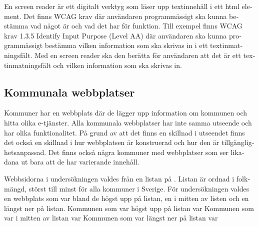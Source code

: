\documentclass[11p]{article}
\begin{document}
\begin{otherlanguage}{swedish}
    En screen reader är ett digitalt verktyg som läser upp textinnehåll i ett html element.
    Det finns WCAG krav där användaren programmässigt ska kunna bestämma vad något är och vad det har för funktion.
    Till exempel finns WCAG krav 1.3.5 Identify Input Purpose (Level AA) där användaren ska kunna programmässigt bestämma vilken information som ska skrivas in i ett textinmatningsfält.
    Med en screen reader ska den berätta för användaren att det är ett textinmatningsfält och vilken information som ska skrivas in.

    \subsection{Kommunala webbplatser} %
    Kommuner har en webbplats där de lägger upp information om kommunen och hitta olika e-tjänster.
    Alla kommunala webbplatser har inte samma utseende och har olika funktionalitet.
    På grund av att det finns en skillnad i utseendet finns det också en skillnad i hur webbplatsen är konstruerad och hur den är tillgänglighetsanpassad.
    Det finns också några kommuner med webbplatser som ser likadana ut bara att de har varierande innehåll.
    
    Webbsidorna i undersökningen valdes från en listan på \textcite{SverigesKommuner}.
    Listan är ordnad i folkmängd, störst till minst för alla kommuner i Sverige.
    För undersökningen valdes en webbplats som var bland de högst upp på listan, en i mitten av listen och en längst ner på listan.
    Kommunen som var högst upp på listan var \textcite{Linköpings_kommun}
    Kommunen som var i mitten av listan var \textcite{Höörs_kommun}
    Kommunen som var längst ner på listan var \textcite{Sorsele_kommun}
    

\end{otherlanguage}
\end{document}
